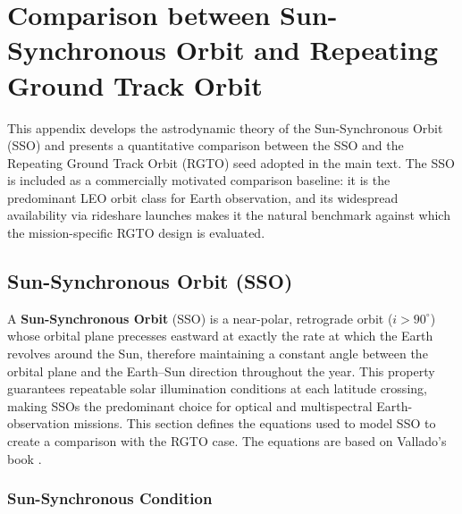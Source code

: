 \chapter{Comparison between Sun-Synchronous Orbit and Repeating Ground Track Orbit}
\label{app:sso_orbit}

This appendix develops the astrodynamic theory of the Sun-Synchronous Orbit (SSO) and presents a quantitative comparison between the SSO and the Repeating Ground Track Orbit (RGTO) seed adopted in the main text.  The SSO is included as a commercially motivated comparison baseline: it is the predominant LEO orbit class for Earth observation, and its widespread availability via rideshare launches makes it the natural benchmark against which the mission-specific RGTO design is evaluated.

\section{Sun-Synchronous Orbit (SSO)}
\label{72-SSO_intro}

A \textbf{Sun-Synchronous Orbit} (SSO) is a near-polar, retrograde orbit ($i > 90^{\circ}$) whose orbital plane precesses eastward at exactly the rate at which the Earth revolves around the Sun, therefore maintaining a constant angle between the orbital plane and the Earth--Sun direction throughout the year.  This property guarantees repeatable solar illumination conditions at each latitude crossing, making SSOs the predominant choice for optical and multispectral Earth-observation missions. This section defines the equations used to model SSO to create a comparison with the RGTO case. The equations are based on Vallado's book \cite{valladoFundamentalsAstrodynamicsApplications2001}.

\subsection{Sun-Synchronous Condition}
\label{sec:sso_condition}

